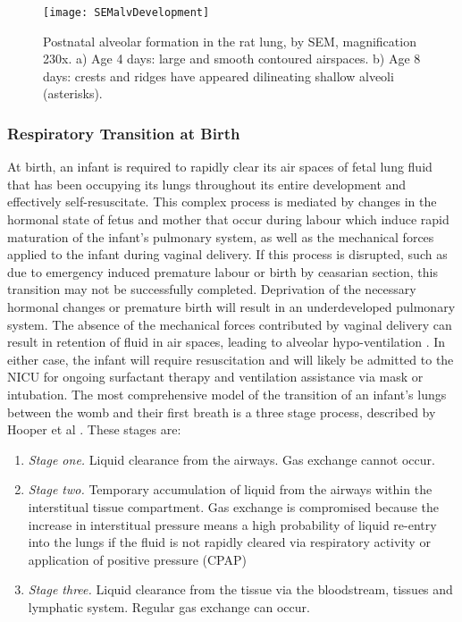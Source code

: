 \documentclass[12pt, openany, oneside]{book}
\begin{document}
\begin{figure}
	\begin{center}
	
	\texttt{[image: SEMalvDevelopment]}
	\caption[Postnatal alveolar formation in the rat lung]{Postnatal alveolar formation in the rat lung, by SEM, magnification 230x. a) Age 4 days: large and smooth contoured airspaces. b) Age 8 days: crests and ridges have appeared dilineating shallow alveoli (asterisks). \citep{burri1984fetal}} 
	\label{fig:alvdelv}

	
	\end{center}

\end{figure}




\subsubsection{Respiratory Transition at Birth}
At birth, an infant is required to rapidly clear its air spaces of fetal lung fluid that has been occupying its lungs throughout its entire development and effectively self-resuscitate. This complex process is mediated by changes in the hormonal state of fetus and mother that occur during labour which induce rapid maturation of the infant's pulmonary system, as well as the mechanical forces applied to the infant during vaginal delivery. If this process is disrupted, such as due to emergency induced premature labour or birth by ceasarian section, this transition may not be successfully completed. Deprivation of the necessary hormonal changes or premature birth will result in an underdeveloped pulmonary system. The absence of the mechanical forces contributed by vaginal delivery can result in retention of fluid in air spaces, leading to alveolar hypo-ventilation \cite{jain2006physiology}. In either case, the infant will require resuscitation and will likely be admitted to the NICU for ongoing surfactant therapy and ventilation assistance via mask or intubation.
The most comprehensive model of the transition of an infant's lungs between the womb and their first breath is a three stage process, described by Hooper et al \cite{hooper2016}. These stages are:
\begin{enumerate}
\item{\textit{Stage one.}} Liquid clearance from the airways. Gas exchange cannot occur.
\item {\textit{Stage two.}} Temporary accumulation of liquid from the airways within the interstitual tissue compartment. Gas exchange is compromised because the increase in interstitual pressure means a high probability of liquid re-entry into the lungs if the fluid is not rapidly cleared via respiratory activity or application of positive pressure (CPAP)
\item{\textit{Stage three.}} Liquid clearance from the tissue via the bloodstream, tissues and lymphatic system. Regular gas exchange can occur.
\end{enumerate}
\end{document}
